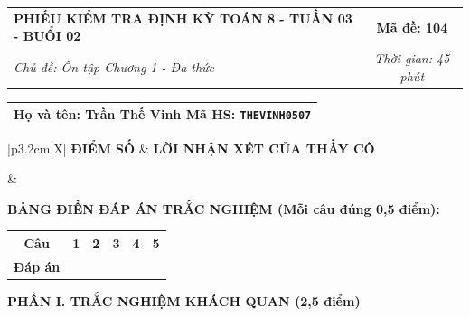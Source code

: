 \documentclass[12pt,a4paper]{article}
\begin{document}
\newpage


\noindent
\begin{tabularx}{\linewidth}{|X|c|}
\hline
\textbf{PHIẾU KIỂM TRA ĐỊNH KỲ TOÁN 8 - TUẦN 03 - BUỔI 02} & \textbf{Mã đề: 104} \\
\textit{Chủ đề: Ôn tập Chương 1 - Đa thức} & \textit{Thời gian: 45 phút} \\
\hline
\end{tabularx}

\vspace{1mm}

\noindent
\begin{tabularx}{\linewidth}{|X|}
\hline
\rule[-2mm]{0pt}{7.5mm}\textbf{Họ và tên:} \textbf{\large Trần Thế Vinh} \hfill \textbf{Mã HS:} \texttt{THEVINH0507} \quad \\
\hline
\end{tabularx}

\vspace{1mm}

\noindent
\begin{tabularx}{\linewidth}{|p{3.2cm}|X|}
\hline
\centering\textbf{ĐIỂM SỐ} & \centering\textbf{LỜI NHẬN XÉT CỦA THẦY CÔ} \tabularnewline
\hline
\rule{0pt}{1.3cm} & \tabularnewline
\hline
\end{tabularx}

\vspace{1.2mm}

\noindent\textbf{BẢNG ĐIỀN ĐÁP ÁN TRẮC NGHIỆM (Mỗi câu đúng 0,5 điểm):}
\vspace{0.8mm}

\noindent
\renewcommand{\arraystretch}{1.35}
\begin{tabularx}{\linewidth}{|c|*{5}{>{\centering\arraybackslash}X|}}
\hline
\textbf{Câu} & \textbf{1} & \textbf{2} & \textbf{3} & \textbf{4} & \textbf{5} \\
\hline
\textbf{Đáp án} & & & & & \\
\hline
\end{tabularx}
\renewcommand{\arraystretch}{1.0}

\vspace{1.5mm}

\noindent\textbf{\large PHẦN I. TRẮC NGHIỆM KHÁCH QUAN (2,5 điểm)}
\vspace{1mm}
\end{document}
